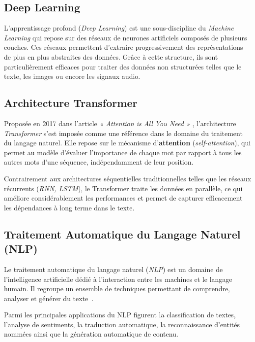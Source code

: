 \subsection{Deep Learning}

L'apprentissage profond (\textit{Deep Learning}) est une sous-discipline du \textit{Machine Learning} qui repose sur des réseaux de neurones artificiels composés de plusieurs couches. Ces réseaux permettent d'extraire progressivement des représentations de plus en plus abstraites des données. Grâce à cette structure, ils sont particulièrement efficaces pour traiter des données non structurées telles que le texte, les images ou encore les signaux audio.

\subsection{Architecture Transformer}

Proposée en 2017 dans l'article \textit{« Attention is All You Need »} \cite{vaswani2017attention}, l'architecture \textit{Transformer} s'est imposée comme une référence dans le domaine du traitement du langage naturel. Elle repose sur le mécanisme d'\textbf{attention} (\textit{self-attention}), qui permet au modèle d'évaluer l'importance de chaque mot par rapport à tous les autres mots d'une séquence, indépendamment de leur position.

Contrairement aux architectures séquentielles traditionnelles telles que les réseaux récurrents (\textit{RNN, LSTM}), le Transformer traite les données en parallèle, ce qui améliore considérablement les performances et permet de capturer efficacement les dépendances à long terme dans le texte.

\subsection{Traitement Automatique du Langage Naturel (NLP)}

Le traitement automatique du langage naturel (\textit{NLP}) est un domaine de l'intelligence artificielle dédié à l'interaction entre les machines et le langage humain. Il regroupe un ensemble de techniques permettant de comprendre, analyser et générer du texte~\cite{jurafsky2024slp}.

Parmi les principales applications du NLP figurent la classification de textes, l'analyse de sentiments, la traduction automatique, la reconnaissance d'entités nommées ainsi que la génération automatique de contenu.


